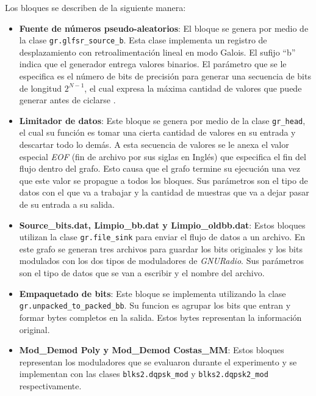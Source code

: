 Los bloques se describen de la siguiente manera:

\begin{itemize}
  \item \textbf{Fuente de n\'umeros pseudo-aleatorios}: El bloque se genera por medio de la clase
  \verb|gr.glfsr_source_b|. Esta clase implementa un registro de desplazamiento con
  retroalimentaci\'on lineal en modo Galois. El sufijo ``b'' indica que el generador entrega valores
  binarios. El par\'ametro que se le especifica es el n\'umero de bits de precisi\'on para generar
  una secuencia de bits de longitud $2^{N-1}$, el cual expresa la m\'axima cantidad de valores
  que puede generar antes de ciclarse \cite{xilinx}. 
  \item \textbf{Limitador de datos}: Este bloque se genera por medio de la clase \verb|gr_head|, el
  cual su funci\'on es tomar una cierta cantidad de valores en su entrada y descartar todo lo
  dem\'as. A esta secuencia de valores se le anexa el valor especial \emph{EOF} (fin de archivo por sus siglas en Ingl\'es) que
  especifica el fin del flujo dentro del grafo. Esto causa que el grafo termine su ejecuci\'on una vez que
  este valor se propague a todos los bloques. Sus par\'ametros son el tipo de datos con el que va a
  trabajar y la cantidad de muestras que va a dejar pasar de su entrada a su salida.
  \item \textbf{Source\_bits.dat, Limpio\_bb.dat y Limpio\_oldbb.dat}: Estos bloques utilizan la
  clase \verb|gr.file_sink| para enviar el flujo de datos a un archivo. En este grafo se generan tres
  archivos para guardar los bits originales y los bits modulados con los dos tipos de moduladores
  de \emph{GNURadio}. Sus par\'ametros son el tipo de datos que se van a escribir y el nombre del
  archivo.
  \item \textbf{Empaquetado de bits}: Este bloque se implementa utilizando la clase \\
  \verb|gr.unpacked_to_packed_bb|. Su funcion es agrupar los bits que entran y formar bytes completos
  en la salida. Estos bytes representan la informaci\'on original.
  \item \textbf{Mod\_Demod Poly y Mod\_Demod Costas\_MM}: Estos bloques representan los moduladores
  que se evaluaron durante el experimento y se implementan con las clases \verb|blks2.dqpsk_mod| y
  \verb|blks2.dqpsk2_mod| respectivamente.
\end{itemize}

